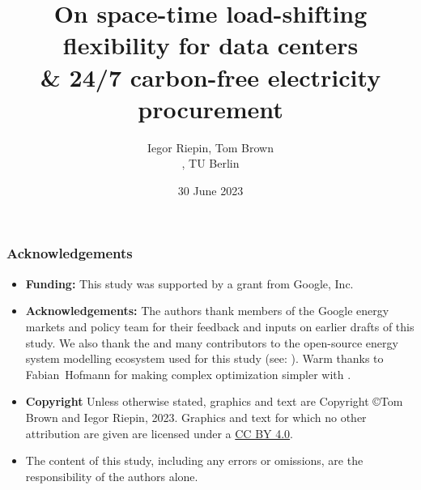 


\title{On space-time load-shifting flexibility for data centers \\ 
      \& 24/7 carbon-free electricity procurement}

\author{
  Iegor Riepin, Tom Brown\\
  , TU Berlin
  }

\date{30 June 2023}




\maketitle

\begin{frame}
  \frametitle{Acknowledgements}

  \begin{itemize}
    \item {\bf Funding:} This study was supported by a grant from Google, Inc. 
    \item {\bf Acknowledgements:} The authors thank members of the Google energy markets and policy team 
    for their feedback and inputs on earlier drafts of this study. 
    We also thank the  and many contributors to the open-source 
    energy system modelling ecosystem used for this study (see: ).
    Warm thanks to Fabian~Hofmann for making complex optimization simpler with . 
    \item 
    {\bf Copyright} Unless otherwise stated, graphics and text are Copyright \copyright Tom Brown and Iegor Riepin, 2023.
    Graphics and text for which no other attribution are given are licensed under a 
    \href{https://creativecommons.org/licenses/by/4.0/}{CC BY 4.0}.  {\footnotesize \ccby} 
    \item The content of this study, including any errors or omissions, are the responsibility
    of the authors alone.
  \end{itemize}

\end{frame}



